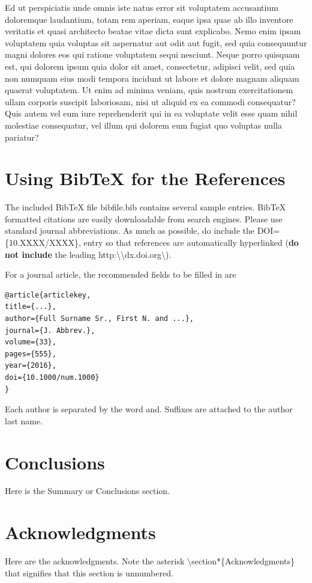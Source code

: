 \documentclass[10pt,a4paper,twoside]{article}
\begin{document}
Ed ut perspiciatis unde omnis iste natus error sit voluptatem accusantium doloremque laudantium, totam rem aperiam, eaque ipsa quae ab illo inventore veritatis et quasi architecto beatae vitae dicta sunt explicabo. Nemo enim ipsam voluptatem quia voluptas sit aspernatur aut odit aut fugit, sed quia consequuntur magni dolores eos qui ratione voluptatem sequi nesciunt. Neque porro quisquam est, qui dolorem ipsum quia dolor sit amet, consectetur, adipisci velit, sed quia non numquam eius modi tempora incidunt ut labore et dolore magnam aliquam quaerat voluptatem. Ut enim ad minima veniam, quis nostrum exercitationem ullam corporis suscipit laboriosam, nisi ut aliquid ex ea commodi consequatur? Quis autem vel eum iure reprehenderit qui in ea voluptate velit esse quam nihil molestiae consequatur, vel illum qui dolorem eum fugiat quo voluptas nulla pariatur?

\section{Using BibTeX for the References}
The included BibTeX file {\ttfamily bibfile}.{\ttfamily bib} contains several sample entries. BibTeX formatted citations are easily downloadable from search engines. Please use standard journal abbreviations. As much as possible, do include the {\ttfamily DOI}=\{{\ttfamily 10.XXXX}/{\ttfamily XXXX}\}{\ttfamily ,} entry so that references are automatically hyperlinked (\textbf{do not include} the leading {\ttfamily http}:\textbackslash\textbackslash{\ttfamily dx.doi.org}\textbackslash).

For a journal article, the recommended fields to be filled in are
\begin{verbatim}
@article{articlekey,
title={...},
author={Full Surname Sr., First N. and ...},
journal={J. Abbrev.},
volume={33},
pages={555},
year={2016},
doi={10.1000/num.1000}
}
\end{verbatim}
Each author is separated by the word {\ttfamily and}. Suffixes are attached to the author last name.

\section{Conclusions}
Here is the Summary or Conclusions section.

\section*{Acknowledgments}
Here are the acknowledgments. Note the asterisk \textbackslash{\ttfamily section*}\{{\ttfamily Acknowledgments}\} that signifies that this section is unnumbered.



\end{document}
